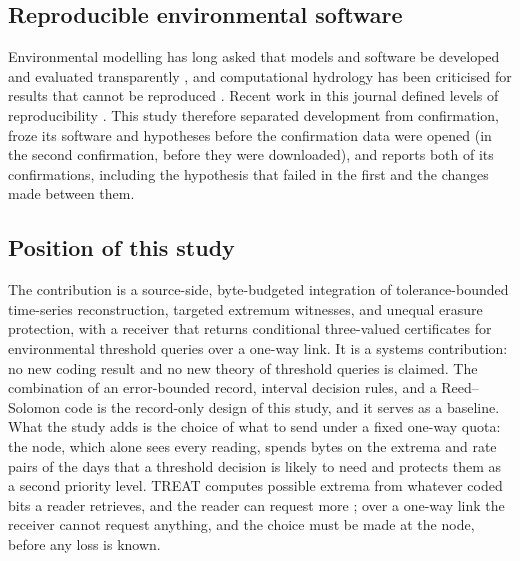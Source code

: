 \subsection{Reproducible environmental software}
Environmental modelling has long asked that models and software be developed and evaluated transparently \citep{jakeman2006}, and computational hydrology has been criticised for results that cannot be reproduced \citep{hutton2016}. Recent work in this journal defined levels of reproducibility \citep{essawy2020,choi2021}. This study therefore separated development from confirmation, froze its software and hypotheses before the confirmation data were opened (in the second confirmation, before they were downloaded), and reports both of its confirmations, including the hypothesis that failed in the first and the changes made between them.

\subsection{Position of this study}
The contribution is a source-side, byte-budgeted integration of tolerance-bounded time-series reconstruction, targeted extremum witnesses, and unequal erasure protection, with a receiver that returns conditional three-valued certificates for environmental threshold queries over a one-way link. It is a systems contribution: no new coding result and no new theory of threshold queries is claimed. The combination of an error-bounded record, interval decision rules, and a Reed--Solomon code is the record-only design of this study, and it serves as a baseline. What the study adds is the choice of what to send under a fixed one-way quota: the node, which alone sees every reading, spends bytes on the extrema and rate pairs of the days that a threshold decision is likely to need and protects them as a second priority level. TREAT computes possible extrema from whatever coded bits a reader retrieves, and the reader can request more \citep{taurone2024treat}; over a one-way link the receiver cannot request anything, and the choice must be made at the node, before any loss is known.

